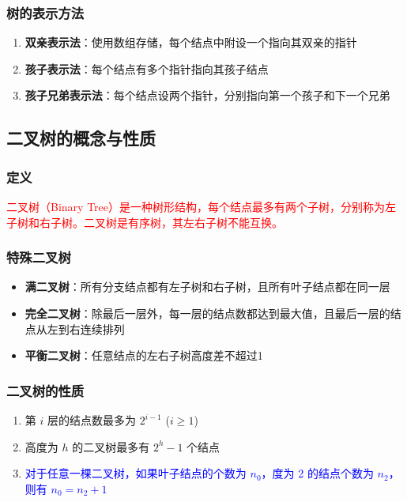 \documentclass{../../note}
\begin{document}
\subsubsection{树的表示方法}
\begin{enumerate}
\item \textbf{双亲表示法}：使用数组存储，每个结点中附设一个指向其双亲的指针
\item \textbf{孩子表示法}：每个结点有多个指针指向其孩子结点
\item \textbf{孩子兄弟表示法}：每个结点设两个指针，分别指向第一个孩子和下一个兄弟
\end{enumerate}

\subsection{二叉树的概念与性质}

\subsubsection{定义}
\textcolor{red}{二叉树（Binary Tree）是一种树形结构，每个结点最多有两个子树，分别称为左子树和右子树。二叉树是有序树，其左右子树不能互换。}

\subsubsection{特殊二叉树}
\begin{itemize}
\item \textbf{满二叉树}：所有分支结点都有左子树和右子树，且所有叶子结点都在同一层
\item \textbf{完全二叉树}：除最后一层外，每一层的结点数都达到最大值，且最后一层的结点从左到右连续排列
\item \textbf{平衡二叉树}：任意结点的左右子树高度差不超过1
\end{itemize}

\subsubsection{二叉树的性质}
\begin{enumerate}
\item 第 $i$ 层的结点数最多为 $2^{i-1}$ ($i \geq 1$)
\item 高度为 $h$ 的二叉树最多有 $2^h-1$ 个结点
\item \textcolor{blue}{对于任意一棵二叉树，如果叶子结点的个数为 $n_0$，度为 2 的结点个数为 $n_2$，则有 $n_0 = n_2 + 1$}
\end{enumerate}
\end{document}
